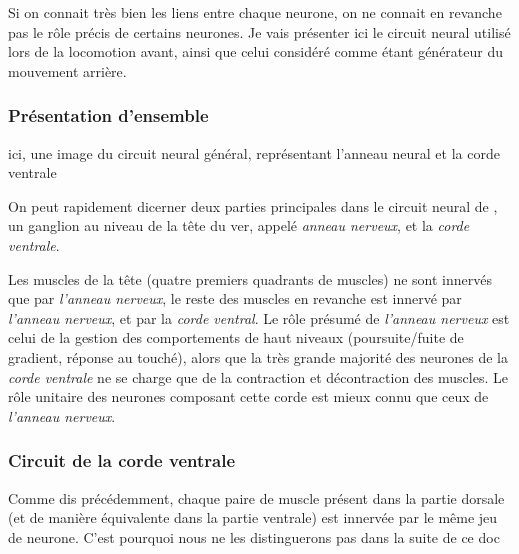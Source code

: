 Si on connait très bien les liens entre chaque neurone, on ne connait en
revanche pas le rôle précis de certains neurones. Je vais présenter ici le
circuit neural utilisé lors de la locomotion avant, ainsi que celui
considéré comme étant générateur du mouvement arrière.

\subsubsection{Présentation d'ensemble} %
\label{ssub:Présentation d'ensemble}

\begin{center}
   ici, une image du circuit neural général, représentant l'anneau neural et la corde ventrale
\end{center}

On peut rapidement dicerner deux parties principales dans le circuit neural de
\celeg{}, un ganglion au niveau de la tête du ver, appelé \textit{anneau
nerveux}, et la \textit{corde ventrale}.

Les muscles de la tête (quatre premiers quadrants de muscles) ne sont innervés que
par \textit{l'anneau nerveux}, le reste des muscles en revanche est innervé
par \textit{l'anneau nerveux}, et par la \textit{corde ventral}.  Le rôle
présumé de \textit{l'anneau nerveux} est celui de la gestion des comportements
de haut niveaux (poursuite/fuite de gradient, réponse au touché), alors que la
très grande majorité des neurones de la \textit{corde ventrale} ne se charge que
de la contraction et décontraction des muscles. Le rôle unitaire des neurones
composant cette corde est mieux connu que ceux de \textit{l'anneau nerveux}.


\subsubsection{Circuit de la corde ventrale} %
\label{ssub:Circuit de la corde ventrale}

Comme dis précédemment, chaque paire de muscle présent dans la partie dorsale
(et de manière équivalente dans la partie ventrale) est innervée par le même
jeu de neurone. C'est pourquoi nous ne les distinguerons pas dans la
suite de ce doc


